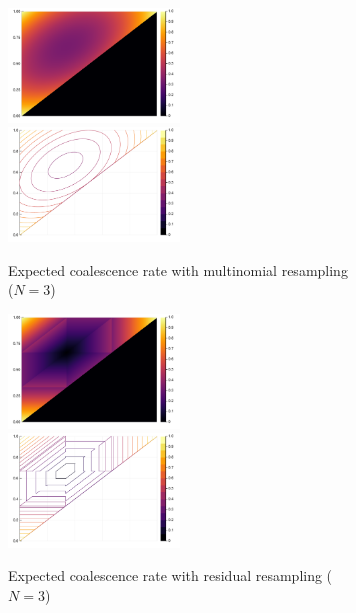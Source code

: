 \documentclass{article}
\newcommand{\1}[1]{\mathbbm{1}_{#1}}
\begin{document}
\begin{figure}
	\centering
	\begin{subfigure}{\textwidth}
		\includegraphics[width=0.5\textwidth]{plots/EcN_mn_N3_heatmap.pdf}
		\includegraphics[width=0.5\textwidth]{plots/EcN_mn_N3_contour.pdf}
	\caption{Expected coalescence rate with multinomial resampling ($N=3$)}
	\end{subfigure}
	\begin{subfigure}{\textwidth}
		\includegraphics[width=0.5\textwidth]{plots/EcN_res_N3_heatmap.pdf}
		\includegraphics[width=0.5\textwidth]{plots/EcN_res_N3_contour.pdf}
	\caption{Expected coalescence rate with residual resampling ($N=3$)}
	\end{subfigure}
	\begin{subfigure}{\textwidth}

\end{subfigure}
\end{figure}
\end{document}
